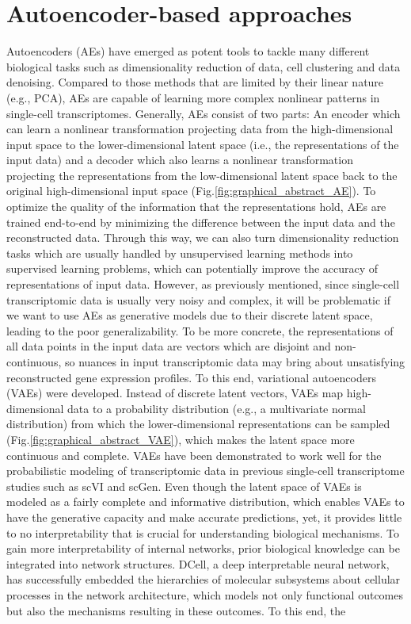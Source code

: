 \section{Autoencoder-based approaches}
Autoencoders\cite{Hinton2006} (AEs) have emerged as potent tools to tackle many different biological tasks such as dimensionality reduction of data\cite{Wang2018}, cell clustering\cite{Geddes2019} and data denoising\cite{Eraslan2019}. Compared to those methods that are limited by their linear nature (e.g., PCA), AEs are capable of learning more complex nonlinear patterns in single-cell transcriptomes. Generally, AEs consist of two parts: An encoder which can learn a nonlinear transformation projecting data from the high-dimensional input space to the lower-dimensional latent space (i.e., the representations of the input data) and a decoder which also learns a nonlinear transformation projecting the representations from the low-dimensional latent space back to the original high-dimensional input space\cite{Kleut2020} (Fig.\ref{fig:graphical_abstract_AE}). To optimize the quality of the information that the representations hold, AEs are trained end-to-end by minimizing the difference between the input data and the reconstructed data. Through this way, we can also turn dimensionality reduction tasks which are usually handled by unsupervised learning methods into supervised learning problems, which can potentially improve the accuracy of representations of input data. However, as previously mentioned, since single-cell transcriptomic data is usually very noisy and complex, it will be problematic if we want to use AEs as generative models due to their discrete latent space, leading to the poor generalizability. To be more concrete, the representations of all data points in the input data are vectors which are disjoint and non-continuous\cite{Kleut2020}, so nuances in input transcriptomic data may bring about unsatisfying reconstructed gene expression profiles. To this end, variational autoencoders\cite{Kingma2014} (VAEs) were developed. Instead of discrete latent vectors, VAEs map high-dimensional data to a probability distribution (e.g., a multivariate normal distribution) from which the lower-dimensional representations can be sampled (Fig.\ref{fig:graphical_abstract_VAE}), which makes the latent space more continuous and complete\cite{Kleut2020,Rocca2019}. VAEs have been demonstrated to work well for the probabilistic modeling of transcriptomic data in previous single-cell transcriptome studies such as scVI\cite{Lopez2018} and scGen\cite{Lotfollahi2019}. Even though the latent space of VAEs is modeled as a fairly complete and informative distribution, which enables VAEs to have the generative capacity and make accurate predictions, yet, it provides little to no interpretability that is crucial for understanding biological mechanisms. To gain more interpretability of internal networks, prior biological knowledge can be integrated into network structures. DCell\cite{Ma2018}, a deep interpretable neural network, has successfully embedded the hierarchies of molecular subsystems about cellular processes in the network architecture, which models not only functional outcomes but also the mechanisms resulting in these outcomes. To this end, the 